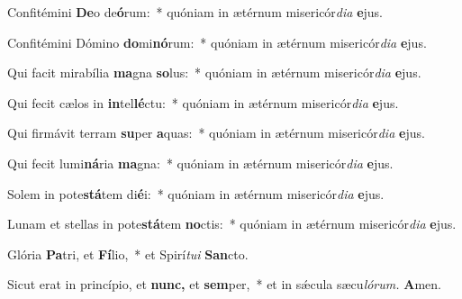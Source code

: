 \item Confitémini \textbf{De}o de\textbf{ó}rum:~* quóniam in ætérnum misericór\textit{dia} \textbf{e}jus.
\item Confitémini Dómino \textbf{do}mi\textbf{nó}rum:~* quóniam in ætérnum misericór\textit{dia} \textbf{e}jus.
\item Qui facit mirabília \textbf{ma}gna \textbf{so}lus:~* quóniam in ætérnum misericór\textit{dia} \textbf{e}jus.
\item Qui fecit cælos in \textbf{in}tel\textbf{lé}ctu:~* quóniam in ætérnum misericór\textit{dia} \textbf{e}jus.
\item Qui firmávit terram \textbf{su}per \textbf{a}quas:~* quóniam in ætérnum misericór\textit{dia} \textbf{e}jus.
\item Qui fecit lumi\textbf{ná}ria \textbf{ma}gna:~* quóniam in ætérnum misericór\textit{dia} \textbf{e}jus.
\item Solem in pote\textbf{stá}tem di\textbf{é}i:~* quóniam in ætérnum misericór\textit{dia} \textbf{e}jus.
\item Lunam et stellas in pote\textbf{stá}tem \textbf{no}ctis:~* quóniam in ætérnum misericór\textit{dia} \textbf{e}jus.
\item Glória \textbf{Pa}tri, et \textbf{Fí}lio,~* et Spirí\hspace{0.03em}\textit{tui} \textbf{San}cto.
\item Sicut erat in princípio, et \textbf{nunc,} et \textbf{sem}per,~* et in sǽcula sæcu\hspace{0.03em}\textit{lórum.} \textbf{A}men.